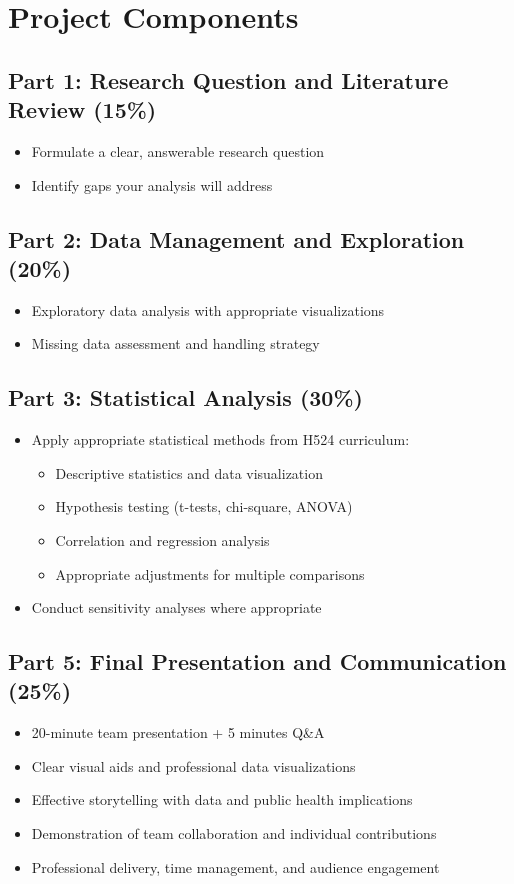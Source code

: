 \documentclass[11pt]{article}
\begin{document}
\section{Project Components}

\subsection{Part 1: Research Question and Literature Review (15\%)}
\begin{itemize}
\item Formulate a clear, answerable research question
\item Identify gaps your analysis will address
\end{itemize}

\subsection{Part 2: Data Management and Exploration (20\%)}
\begin{itemize}
\item Exploratory data analysis with appropriate visualizations
\item Missing data assessment and handling strategy
\end{itemize}

\subsection{Part 3: Statistical Analysis (30\%)}
\begin{itemize}
\item Apply appropriate statistical methods from H524 curriculum:
    \begin{itemize}
    \item Descriptive statistics and data visualization
    \item Hypothesis testing (t-tests, chi-square, ANOVA)
    \item Correlation and regression analysis
    \item Appropriate adjustments for multiple comparisons
    \end{itemize}
\item Conduct sensitivity analyses where appropriate
\end{itemize}

\subsection{Part 5: Final Presentation and Communication (25\%)}
\begin{itemize}
\item 20-minute team presentation + 5 minutes Q\&A
\item Clear visual aids and professional data visualizations
\item Effective storytelling with data and public health implications
\item Demonstration of team collaboration and individual contributions
\item Professional delivery, time management, and audience engagement
\end{itemize}
\end{document}
